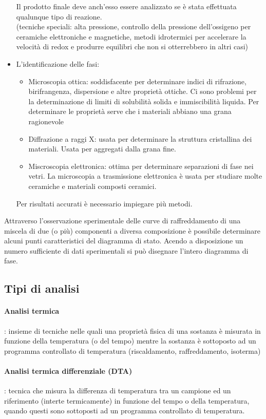 \documentclass{article}
\begin{document}
\begin{itemize}
    Il prodotto finale deve anch'esso essere analizzato se è stata effettuata qualunque tipo di reazione.\\
    (tecniche speciali: alta pressione, controllo della pressione dell'ossigeno per ceramiche elettroniche e magnetiche, metodi idrotermici per accelerare la velocità di redox e produrre equilibri che non si otterrebbero in altri casi)
    \item L'identificazione delle fasi: 
    \begin{itemize}
        \item Microscopia ottica: soddisfacente per determinare indici di rifrazione, birifrangenza, dispersione e altre proprietà ottiche. Ci sono problemi per la determinazione di limiti di solubilità solida e immiscibilità liquida. Per determinare le proprietà serve che i materiali abbiano una grana ragionevole
        \item Diffrazione a raggi X: usata per determinare la struttura cristallina dei materiali. Usata per aggregati dalla grana fine.
        \item Miscroscopia elettronica: ottima per determinare separazioni di fase nei vetri. La microscopia a trasmissione elettronica è usata per studiare molte ceramiche e materiali composti ceramici.
    \end{itemize}
    Per risultati accurati è necessario impiegare più metodi.
\end{itemize}
Attraverso l'osservazione sperimentale delle curve di raffreddamento di una miscela di due (o più) componenti a diversa composizione è possibile determinare alcuni punti caratteristici del diagramma di stato. Acendo a disposizione un numero sufficiente di dati sperimentali si può disegnare l'intero diagramma di fase.

\subsection{Tipi di analisi}
\paragraph{Analisi termica}: insieme di tecniche nelle quali una proprietà fisica di una sostanza è misurata in funzione della temperatura (o del tempo) mentre la sostanza è sottoposto ad un programma controllato di temperatura (riscaldamento, raffreddamento, isoterma)
\paragraph{Analisi termica differenziale (DTA)}: tecnica che misura la differenza di temperatura tra un campione ed un riferimento (interte termicamente) in funzione del tempo o della temperatura, quando questi sono sottoposti ad un programma controllato di temperatura.
\end{document}
